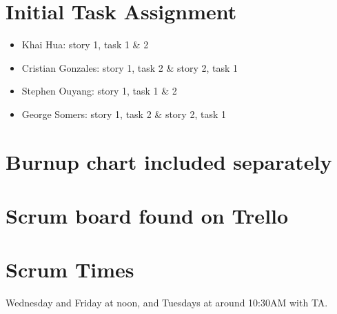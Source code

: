 \documentclass[11pt]{article}
\begin{document}
	\section{Initial Task Assignment}
	    \vspace{-3mm}
	    \begin{itemize}
		    \item Khai Hua: story 1, task 1 \& 2
		    \item Cristian Gonzales: story 1, task 2 \& story 2, task 1
		    \item Stephen Ouyang: story 1, task 1 \& 2
		    \item George Somers: story 1, task 2 \& story 2, task 1
		\end{itemize}
	\section{Burnup chart included separately}
	\section{Scrum board found on Trello}
	\section{Scrum Times}
	    Wednesday and Friday at noon, and Tuesdays at around 10:30AM with TA.
\end{document}
